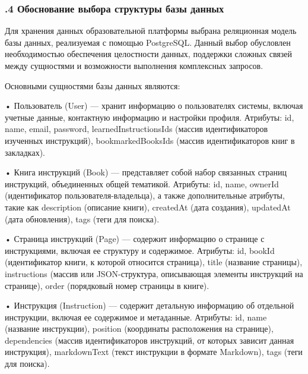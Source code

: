 \subtitlespace

\subsubsection*{ 
  \gostTitleFont
  .4 Обоснование выбора структуры базы данных
} 

\subtitlespace

{\gostFont

  \par \redline Для хранения данных образовательной платформы выбрана реляционная модель базы данных, реализуемая с помощью PostgreSQL. Данный выбор обусловлен необходимостью обеспечения целостности данных, поддержки сложных связей между сущностями и возможности выполнения комплексных запросов.

  \par \redline Основными сущностями базы данных являются:

  \par \redline • Пользователь (User) — хранит информацию о пользователях системы, включая учетные данные, контактную информацию и настройки профиля. Атрибуты: id, name, email, password, learnedInstructionsIds (массив идентификаторов изученных инструкций), bookmarkedBooksIds (массив идентификаторов книг в закладках).
  
  \par \redline • Книга инструкций (Book) — представляет собой набор связанных страниц инструкций, объединенных общей тематикой. Атрибуты: id, name, ownerId (идентификатор пользователя-владельца), а также дополнительные атрибуты, такие как description (описание книги), createdAt (дата создания), updatedAt (дата обновления), tags (теги для поиска).
  
  \par \redline • Страница инструкций (Page) — содержит информацию о странице с инструкциями, включая ее структуру и содержимое. Атрибуты: id, bookId (идентификатор книги, к которой относится страница), title (название страницы), instructions (массив или JSON-структура, описывающая элементы инструкций на странице), order (порядковый номер страницы в книге).
  
  \par \redline • Инструкция (Instruction) — содержит детальную информацию об отдельной инструкции, включая ее содержимое и метаданные. Атрибуты: id, name (название инструкции), position (координаты расположения на странице), dependencies (массив идентификаторов инструкций, от которых зависит данная инструкция), markdownText (текст инструкции в формате Markdown), tags (теги для поиска).

}
